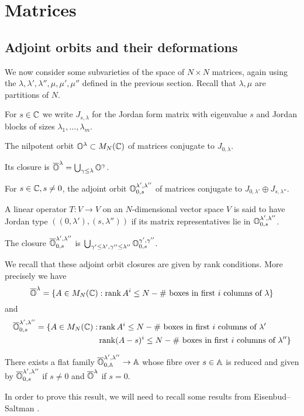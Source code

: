 \documentclass[draft]{article}
\begin{document}
\section{Matrices}

\subsection{Adjoint orbits and their deformations}
 We now consider some subvarieties of the space of $ N\times N$ matrices, again using the $ \lambda, \lambda', \lambda'', \mu, \mu', \mu''$ defined in the previous section.  Recall that $\lambda, \mu $ are partitions of $ N$.

 For $ s \in \CC$ 
    we write $ J_{s,\lambda}$ for the Jordan form matrix with eigenvalue $ s$ and Jordan blocks of sizes $ \lambda_1, \dots, \lambda_m$. 
    
\begin{definition}
The nilpotent orbit $ \OO^\lambda \subset M_N(\CC)$ of matrices conjugate to $ J_{0,\lambda}$.
\end{definition}  Its closure is $ \overline{\OO}^\lambda = \bigcup_{\gamma \le \lambda} \OO^{\gamma}$.
\begin{definition}
    For $ s \in \CC, s \ne 0$, the adjoint orbit $ \OO^{\lambda', \lambda''}_{0,s}$ of matrices conjugate to $ J_{0,\lambda'} \oplus J_{s,\lambda''}$.
\end{definition}  
A linear operator $ T : V \rightarrow V $ on an $N$-dimensional vector space $V$ is said to have Jordan type $((0,\lambda'), (s,\lambda''))$ if its matrix representatives lie in $ \OO^{\lambda', \lambda''}_{0,s}$.
% 

The closure $ \overline{\OO}^{\lambda', \lambda''}_{0,s}$ is $\bigcup_{\gamma' \le \lambda', \gamma'' \le \lambda''} \OO^{\gamma', \gamma''}_{0,s}$.     
     
We recall that these adjoint orbit closures are given by rank conditions.  More precisely we have
$$
    \overline{\OO}^\lambda = \{ A \in M_N(\CC) : \rk A^i \le N - \#\text{~boxes in first $i$ columns of }\lambda \}
$$
and
\begin{equation} 
\label{eq:ranks}
\begin{split}
    \overline{\OO}^{\lambda', \lambda''}_{0,s} = \{ A \in M_N(\CC) : &\rk A^i \le N - 
    \#\text{~boxes in first $i$ columns of }\lambda' \\
    &\rk (A-s)^i \le N - \#\text{~boxes in first $i$ columns of }\lambda'' \}
\end{split}
\end{equation}
%  
\begin{proposition} \label{prop:adjoint}
    There exists a flat family  $\overline{\OO}^{\lambda', \lambda''}_{0,\AA} \rightarrow \AA$ whose fibre over $s \in \AA$ is reduced and given by
       $ \overline{\OO}^{\lambda', \lambda''}_{0,s}$ if $s \ne 0 $ and
$        \overline{\OO}^\lambda $ if $ s = 0$.
\end{proposition}
% 
In order to prove this result, we will need to recall some results from Eisenbud--Saltman \cite{eisenbud1989rank}.
% 
\end{document}
